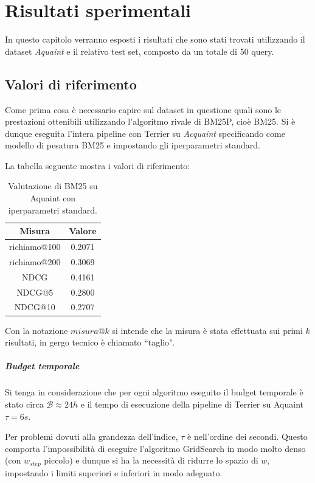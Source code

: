\chapter{Risultati sperimentali}

In questo capitolo verranno esposti i risultati che sono stati trovati
utilizzando il dataset \textit{Aquaint} e il relativo test set, composto
da un totale di 50 query.

\section{Valori di riferimento}
Come prima cosa è necessario capire sul dataset in questione
quali sono le prestazioni ottenibili utilizzando l'algoritmo rivale di BM25P, cioè BM25.
Si è dunque eseguita l'intera pipeline con Terrier su \textit{Acquaint} specificando come modello
di pesatura BM25 e impostando gli iperparametri standard.

La tabella seguente mostra i valori di riferimento:

\begin{table}[h!]
	\centering
	\begin{tabular}{|c|c|}
		\hline
		\textbf{Misura} & \textbf{Valore} \\
		\hline
		richiamo@100 & 0.2071 \\
		\hline
		richiamo@200 & 0.3069 \\
		\hline
		NDCG & 0.4161 \\
		\hline
		NDCG@5 & 0.2800 \\
		\hline
		NDCG@10 & 0.2707 \\
		\hline
	\end{tabular}
\caption{Valutazione di BM25 su Aquaint con iperparametri standard.}
\end{table}

Con la notazione $misura@k$ si intende che
la misura è stata effettuata sui primi $k$ risultati, in gergo tecnico
è chiamato ``taglio".

\paragraph{Budget temporale} Si tenga in considerazione che per ogni algoritmo
eseguito il budget temporale è stato circa $\mathcal{B} \approx 24h$
e il tempo di esecuzione della pipeline di Terrier su Aquaint $\tau = 6s$.

Per problemi dovuti alla grandezza dell'indice, $\tau$ è nell'ordine dei secondi.
Questo comporta l'impossibilità di eseguire l'algoritmo GridSearch
in modo molto denso (con $w_{step}$ piccolo) e dunque si ha la necessità
di ridurre lo spazio di $w$, impostando i limiti superiori e inferiori
in modo adeguato.

